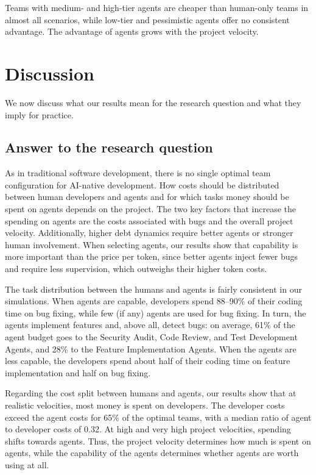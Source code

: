 \documentclass[smallextended]{svjour3}       %
\begin{document}
\begin{summarybox}
Teams with medium- and high-tier agents are cheaper than human-only teams in almost all scenarios, while low-tier and pessimistic agents offer no consistent advantage. The advantage of agents grows with the project velocity.
\end{summarybox}


\section{Discussion}
\label{sec:discussion}

We now discuss what our results mean for the research question and what they imply for practice.

\subsection{Answer to the research question}
\label{sec:discussion:rq}

As in traditional software development, there is no single optimal team configuration for AI-native development. How costs should be distributed between human developers and agents and for which tasks money should be spent on agents depends on the project. The two key factors that increase the spending on agents are the costs associated with bugs and the overall project velocity. Additionally, higher debt dynamics require better agents or stronger human involvement. When selecting agents, our results show that capability is more important than the price per token, since better agents inject fewer bugs and require less supervision, which outweighs their higher token costs.

The task distribution between the humans and agents is fairly consistent in our simulations. When agents are capable, developers spend 88--90\% of their coding time on bug fixing, while few (if any) agents are used for bug fixing. In turn, the agents implement features and, above all, detect bugs: on average, 61\% of the agent budget goes to the Security Audit, Code Review, and Test Development Agents, and 28\% to the Feature Implementation Agents. When the agents are less capable, the developers spend about half of their coding time on feature implementation and half on bug fixing.

Regarding the cost split between humans and agents, our results show that at realistic velocities, most money is spent on developers. The developer costs exceed the agent costs for 65\% of the optimal teams, with a median ratio of agent to developer costs of 0.32. At high and very high project velocities, spending shifts towards agents. Thus, the project velocity determines how much is spent on agents, while the capability of the agents determines whether agents are worth using at all.
\end{document}
